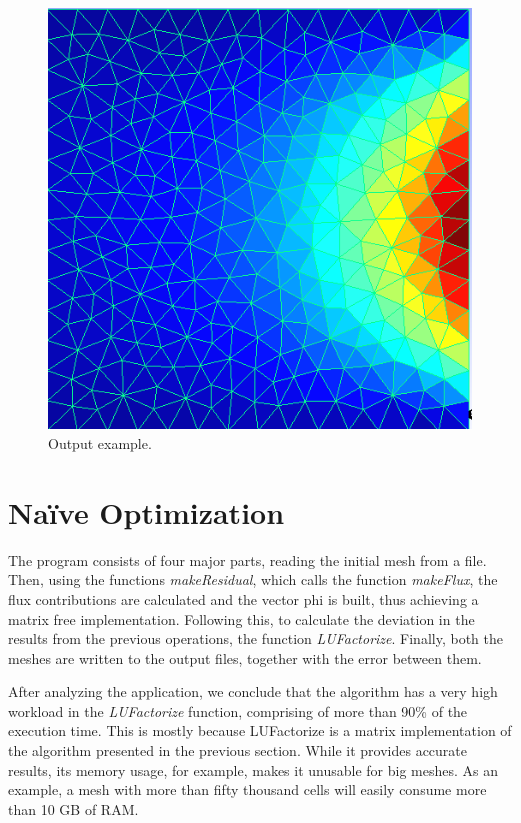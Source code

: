 \documentclass[a4paper,10pt,openright,openbib,twocolumn]{article}
\begin{document}
\begin{figure}[H]
    \centering
    \begin{minipage}[t]{\columnwidth}
        \includegraphics[width=\textwidth]{../images/mesh_output.png}
        \caption{Output example.\label{fig:parallel}}
    \end{minipage}
\end{figure}


\section{Na\"{i}ve Optimization}

The program consists of four major parts, reading the initial mesh from a file. Then, using the functions \emph{makeResidual}, which calls the function \emph{makeFlux}, the flux contributions are calculated and the vector phi is built, thus achieving a matrix free implementation. Following this, to calculate the deviation in the results from the previous operations, the function \emph{LUFactorize}. Finally, both the meshes are written to the output files, together with the error between them.
 
After analyzing the application, we conclude that the algorithm has a very high workload in the \emph{LUFactorize} function, comprising of more than 90\% of the execution time.
This is mostly because LUFactorize is a matrix implementation of the algorithm presented in the previous section. While it provides accurate results, its memory usage, for example, makes it unusable for big meshes. As an example, a mesh with more than fifty thousand cells will easily consume more than 10 GB of RAM.
\end{document}
